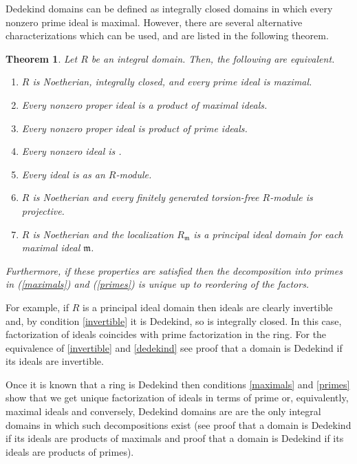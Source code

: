 \documentclass[12pt]{article}
\newtheorem*{theorem*}{Theorem}
\begin{document}
Dedekind domains can be defined as integrally closed  domains in which every nonzero prime ideal is maximal. However, there are several alternative characterizations which can be used, and are listed in the following theorem.

\begin{theorem*}
Let $R$ be an integral domain. Then, the following are equivalent.
\begin{enumerate}
\item $R$ is Noetherian, integrally closed, and every prime ideal is maximal.\label{dedekind}
\item Every nonzero proper ideal is a product of maximal ideals.\label{maximals}
\item Every nonzero proper ideal is product of prime ideals.\label{primes}
\item Every nonzero ideal is .\label{invertible}
\item Every ideal is  as an $R$-module.\label{projective}
\item $R$ is Noetherian and every finitely generated torsion-free $R$-module is projective.\label{projective mod}
\item $R$ is Noetherian and the localization $R_\mathfrak{m}$ is a principal ideal domain for each maximal ideal $\mathfrak{m}$.\label{local}
\end{enumerate}
Furthermore, if these properties are satisfied then the decomposition into primes in (\ref{maximals}) and (\ref{primes}) is unique up to reordering of the factors.
\end{theorem*}

For example, if $R$ is a principal ideal domain then ideals are clearly invertible and, by condition \ref{invertible} it is Dedekind, so is integrally closed. In this case, factorization of ideals coincides with prime factorization in the ring. For the equivalence of \ref{invertible} and \ref{dedekind} see proof that a domain is Dedekind if its ideals are invertible.

Once it is known that a ring is Dedekind then conditions \ref{maximals} and \ref{primes} show that we get unique factorization of ideals in terms of prime or, equivalently, maximal ideals and conversely, Dedekind domains are are the only integral domains in which such decompositions exist (see proof that a domain is Dedekind if its ideals are products of maximals and proof that a domain is Dedekind if its ideals are products of primes).
\end{document}
